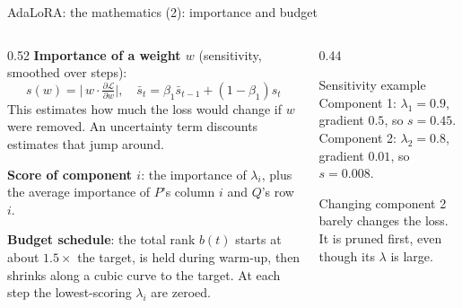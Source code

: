 \documentclass[aspectratio=169,11pt]{beamer}
\begin{document}
\begin{frame}{AdaLoRA: the mathematics (2): importance and budget}
  \begin{columns}[T]
    \begin{column}{0.52\textwidth}
      \small
      \textbf{Importance of a weight $w$} (sensitivity, smoothed over steps):
      \[
        s(w)=\big|\,w\cdot\tfrac{\partial\mathcal L}{\partial w}\big|,\quad
        \bar s_t=\beta_1\bar s_{t-1}+(1-\beta_1)s_t
      \]
      This estimates how much the loss would change if $w$ were removed.
      An uncertainty term discounts estimates that jump around.
      \vspace{1mm}

      \textbf{Score of component $i$}: the importance of $\lambda_i$, plus the average importance of $P$'s column $i$ and $Q$'s row $i$.
      \vspace{1mm}

      \textbf{Budget schedule}: the total rank $b(t)$ starts at about $1.5\times$ the target, is held during warm-up, then shrinks along a cubic curve to the target. At each step the lowest-scoring $\lambda_i$ are zeroed.
    \end{column}
    \begin{column}{0.44\textwidth}
      \begin{exampleblock}{Sensitivity example}
        \small
        Component 1: $\lambda_1=0.9$, gradient $0.5$, so $s=0.45$.\\
        Component 2: $\lambda_2=0.8$, gradient $0.01$, so $s=0.008$.
        \vspace{1mm}

        Changing component 2 barely changes the loss. It is pruned first, even though its $\lambda$ is large.
      \end{exampleblock}
    \end{column}
  \end{columns}
\end{frame}
\end{document}
